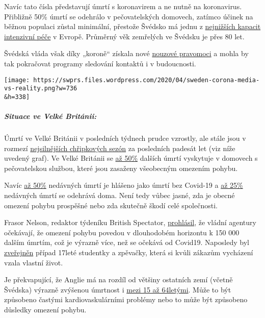  Navíc tato čísla představují úmrtí s koronavirem a ne nutně na
koronavirus. Přibližně 50\% úmrtí se odehrálo v pečovatelských domovech,
zatímco účinek na běžnou populaci zůstal minimální, přestože Švédsko má
jednu z
\href{https://link.springer.com/article/10.1007/s00134-012-2627-8}{nejnižších
kapacit intenzivní péče} v Evropě. Průměrný věk zemřelých ve Švédsku je
přes 80 let.

 Švédská vláda však díky „koroně`` získala nové
\href{https://www.tagesschau.de/faktenfinder/ausland/corona-kursaenderung-schweden-103.html}{nouzové
pravomoci} a mohla by tak pokračovat programy sledování kontaktů i v
budoucnosti.

\texttt{[image: https://swprs.files.wordpress.com/2020/04/sweden-corona-media-vs-reality.png?w=736\\\&h=338]}

\hypertarget{situace-ve-velkuxe9-brituxe1nii}{%
\subparagraph{\texorpdfstring{\textbf{Situace ve Velké
Británii:}}{Situace ve Velké Británii:}}\label{situace-ve-velkuxe9-brituxe1nii}}

Úmrtí ve Velké Británii v posledních týdnech prudce vzrostly, ale stále
jsou v rozmezí \href{http://inproportion2.talkigy.com/}{nejsilnějších
chřipkových sezón} za posledních padesát let (viz níže uvedený graf). Ve
Velké Británii se
\href{https://ltccovid.org/2020/04/12/mortality-associated-with-covid-19-outbreaks-in-care-homes-early-international-evidence/}{až
50\%} dalších úmrtí vyskytuje v domovech s pečovatelskou službou, které
jsou zasaženy všeobecným omezením pohybu.

Navíc \href{https://archive.is/2eKCW}{až 50\%} nedávných úmrtí je
hlášeno jako úmrtí bez Covid-19 a
\href{https://www.ft.com/content/67e6a4ee-3d05-43bc-ba03-e239799fa6ab}{až
25\%} nedávných úmrtí se odehrává doma. Není tedy vůbec jasné, zda je
obecné omezení pohybu prospěšné nebo zda skutečně škodí celé
společnosti.

Frasor Nelson, redaktor týdeníku British Spectator,
\href{https://www.telegraph.co.uk/politics/2020/04/09/boris-worried-lockdown-has-gone-far-can-end/}{prohlásil},
že vládní agentury očekávají, že omezení pohybu povedou v dlouhodobém
horizontu k 150 000 dalším úmrtím, což je výrazně více, než se očekává
od Covid19. Naposledy byl
\href{https://sports.yahoo.com/coronavirus-bethany-palmer-teenager-death-suicide-152707750.html}{zveřejněn}
případ 17leté studentky a zpěvačky, která si kvůli zákazům vycházení
vzala vlastní život.

Je překvapující, že Anglie má na rozdíl od většiny ostatních zemí
(včetně Švédska) výrazně zvýšenou úmrtnost i
\href{https://www.euromomo.eu/}{mezi 15 až 64letými}. Může to být
způsobeno častými kardiovaskulárními problémy nebo to může být způsobeno
důsledky omezení pohybu.


